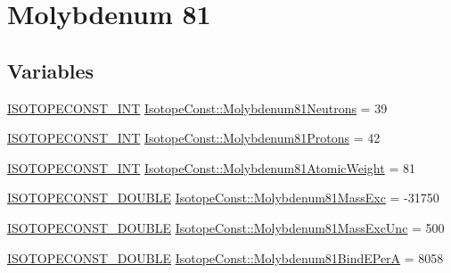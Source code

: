 \hypertarget{group___isotope_const-_molybdenum-_mo81}{}\section{Molybdenum 81}
\label{group___isotope_const-_molybdenum-_mo81}
\subsection*{Variables}
\begin{DoxyCompactItemize}
\item 
\mbox{\hyperlink{group___isotope_const-_macros_ga5f18360b3e99483a35c32d789e62621c}{I\+S\+O\+T\+O\+P\+E\+C\+O\+N\+S\+T\+\_\+\+I\+NT}} \mbox{\hyperlink{group___isotope_const-_molybdenum-_mo81_ga5fb84016451fdf42049b29a58f6d6f73}{Isotope\+Const\+::\+Molybdenum81\+Neutrons}} = 39
\item 
\mbox{\hyperlink{group___isotope_const-_macros_ga5f18360b3e99483a35c32d789e62621c}{I\+S\+O\+T\+O\+P\+E\+C\+O\+N\+S\+T\+\_\+\+I\+NT}} \mbox{\hyperlink{group___isotope_const-_molybdenum-_mo81_ga1d706de18836b0d11ef7da66b9c733bb}{Isotope\+Const\+::\+Molybdenum81\+Protons}} = 42
\item 
\mbox{\hyperlink{group___isotope_const-_macros_ga5f18360b3e99483a35c32d789e62621c}{I\+S\+O\+T\+O\+P\+E\+C\+O\+N\+S\+T\+\_\+\+I\+NT}} \mbox{\hyperlink{group___isotope_const-_molybdenum-_mo81_gad8bde4ce3c064b68156aa56a331079ce}{Isotope\+Const\+::\+Molybdenum81\+Atomic\+Weight}} = 81
\item 
\mbox{\hyperlink{group___isotope_const-_macros_ga8f45a7272ce02c0b4c65c44636ed719a}{I\+S\+O\+T\+O\+P\+E\+C\+O\+N\+S\+T\+\_\+\+D\+O\+U\+B\+LE}} \mbox{\hyperlink{group___isotope_const-_molybdenum-_mo81_ga702867be09e2e830d7c9308e328e4dbc}{Isotope\+Const\+::\+Molybdenum81\+Mass\+Exc}} = -\/31750
\item 
\mbox{\hyperlink{group___isotope_const-_macros_ga8f45a7272ce02c0b4c65c44636ed719a}{I\+S\+O\+T\+O\+P\+E\+C\+O\+N\+S\+T\+\_\+\+D\+O\+U\+B\+LE}} \mbox{\hyperlink{group___isotope_const-_molybdenum-_mo81_ga7ed311345c0ad4761874cea7d732f8a4}{Isotope\+Const\+::\+Molybdenum81\+Mass\+Exc\+Unc}} = 500
\item 
\mbox{\hyperlink{group___isotope_const-_macros_ga8f45a7272ce02c0b4c65c44636ed719a}{I\+S\+O\+T\+O\+P\+E\+C\+O\+N\+S\+T\+\_\+\+D\+O\+U\+B\+LE}} \mbox{\hyperlink{group___isotope_const-_molybdenum-_mo81_ga5755dae39886f665c155737836d351e8}{Isotope\+Const\+::\+Molybdenum81\+Bind\+E\+PerA}} = 8058
\item 

\end{DoxyCompactItemize}
